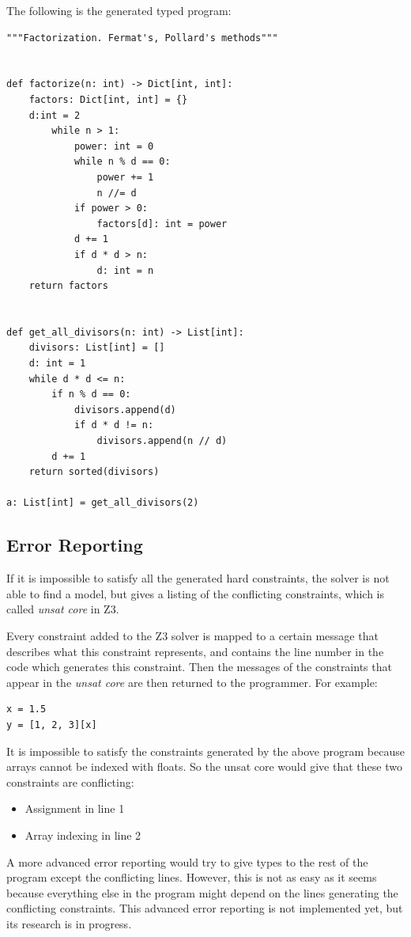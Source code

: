 The following is the generated typed program:

\begin{lstlisting}
"""Factorization. Fermat's, Pollard's methods"""


def factorize(n: int) -> Dict[int, int]:
	factors: Dict[int, int] = {}
	d:int = 2
		while n > 1:
			power: int = 0
			while n % d == 0:
				power += 1
				n //= d
			if power > 0:
				factors[d]: int = power
			d += 1
			if d * d > n:
				d: int = n
	return factors


def get_all_divisors(n: int) -> List[int]:
	divisors: List[int] = []
	d: int = 1
	while d * d <= n:
		if n % d == 0:
			divisors.append(d)
			if d * d != n:
				divisors.append(n // d)
		d += 1
	return sorted(divisors)

a: List[int] = get_all_divisors(2)
\end{lstlisting}
\subsection{Error Reporting}
If it is impossible to satisfy all the generated hard constraints, the solver is not able to find a model, but gives a listing of the conflicting constraints, which is called \textit{unsat core} in Z3.

Every constraint added to the Z3 solver is mapped to a certain message that describes what this constraint represents, and contains the line number in the code which generates this constraint. Then the messages of the constraints that appear in the \textit{unsat core} are then returned to the programmer. For example:
\begin{lstlisting}
x = 1.5
y = [1, 2, 3][x]
\end{lstlisting}

It is impossible to satisfy the constraints generated by the above program because arrays cannot be indexed with floats. So the unsat core would give that these two constraints are conflicting:
\begin{itemize}
	\item Assignment in line 1
	\item Array indexing in line 2
\end{itemize}

A more advanced error reporting would try to give types to the rest of the program except the conflicting lines. However, this is not as easy as it seems because everything else in the program might depend on the lines generating the conflicting constraints. This advanced error reporting is not implemented yet, but its research is in progress.

